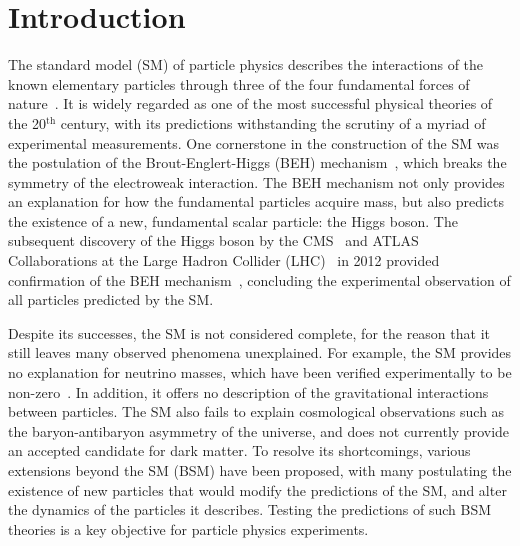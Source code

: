 \chapter{Introduction}
\label{chap:intro}


The standard model (SM) of particle physics describes the interactions of the known elementary particles through three of the four fundamental forces of nature~\cite{Glashow,Salam,Weinberg}. It is widely regarded as one of the most successful physical theories of the 20${^{\mathrm{th}}}$ century, with its predictions withstanding the scrutiny of a myriad of experimental measurements. One cornerstone in the construction of the SM was the postulation of the Brout-Englert-Higgs (BEH) mechanism~\cite{BroutEnglert,HiggsBS1,HiggsBS2,HiggsBS3,Kibble}, which breaks the symmetry of the electroweak interaction. The BEH mechanism not only provides an explanation for how the fundamental particles acquire mass, but also predicts the existence of a new, fundamental scalar particle: the Higgs boson. The subsequent discovery of the Higgs boson by the CMS~\cite{CMS} and ATLAS~\cite{ATLAS} Collaborations at the Large Hadron Collider (LHC)~\cite{LHCTDR} in 2012 provided confirmation of the BEH mechanism~\cite{Aad:2012tfa,Chatrchyan:2012xdj,Chatrchyan:2013lba}, concluding the experimental observation of all particles predicted by the SM.

Despite its successes, the SM is not considered complete, for the reason that it still leaves many observed phenomena unexplained. For example, the SM provides no explanation for neutrino masses, which have been verified experimentally to be non-zero~\cite{neutrino_oscillation}. In addition, it offers no description of the gravitational interactions between particles. The SM also fails to explain cosmological observations such as the baryon-antibaryon asymmetry of the universe, and does not currently provide an accepted candidate for dark matter. To resolve its shortcomings, various extensions beyond the SM (BSM) have been proposed, with many postulating the existence of new particles that would modify the predictions of the SM, and alter the dynamics of the particles it describes. Testing the predictions of such BSM theories is a key objective for particle physics experiments.

